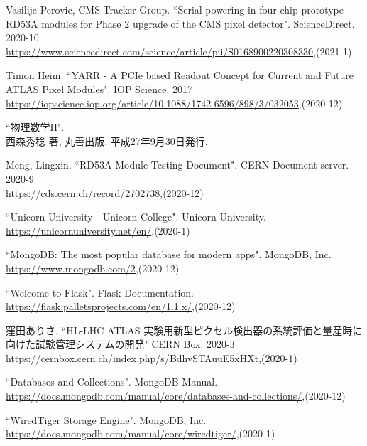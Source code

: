 \begin{thebibliography}{9}
Vasilije Perovic, CMS Tracker Group. ``Serial powering in four-chip prototype RD53A modules for Phase 2 upgrade of the CMS pixel detector". ScienceDirect. 2020-10.\\
\url{https://www.sciencedirect.com/science/article/pii/S0168900220308330},(2021-1)

Timon Heim. ``YARR - A PCIe based Readout Concept for Current and Future ATLAS Pixel Modules". IOP Science. 2017\\
\url{https://iopscience.iop.org/article/10.1088/1742-6596/898/3/032053},(2020-12)

``物理数学II".\\
西森秀稔 著, 丸善出版, 平成27年9月30日発行.

Meng, Lingxin. ``RD53A Module Testing Document". CERN Document server. 2020-9\\
\url{https://cds.cern.ch/record/2702738},(2020-12)

``Unicorn University - Unicorn College". Unicorn University.\\
\url{https://unicornuniversity.net/en/},(2020-1)

``MongoDB: The most popular database for modern apps". MongoDB, Inc. \\
\url{https://www.mongodb.com/2},(2020-12)

``Welcome to Flask". Flask Documentation. \\
\url{https://flask.palletsprojects.com/en/1.1.x/},(2020-12)

窪田ありさ. ``HL-LHC ATLAS 実験用新型ピクセル検出器の系統評価と量産時に向けた試験管理システムの開発" CERN Box. 2020-3\\
\url{https://cernbox.cern.ch/index.php/s/BdhvSTAuuE5xHXt},(2020-1)

``Databases and Collections". MongoDB Manual. \\
\url{https://docs.mongodb.com/manual/core/databases-and-collections/},(2020-12)

``WiredTiger Storage Engine". MongoDB, Inc. \\
\url{https://docs.mongodb.com/manual/core/wiredtiger/},(2020-1)


\end{thebibliography}

